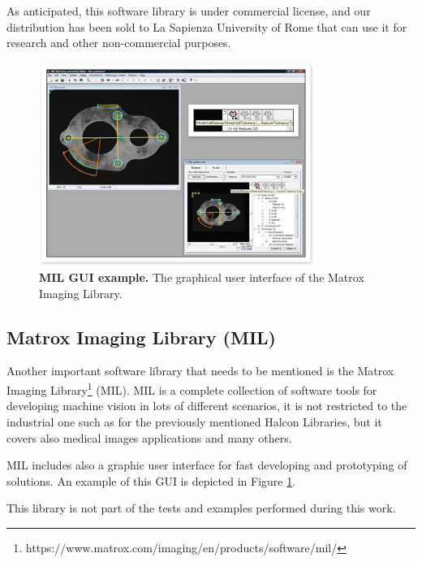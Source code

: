 As anticipated, this software library is under commercial license, and our distribution has been sold to La Sapienza University of Rome that can use it for research and other non-commercial purposes. 

\begin{figure}
    \centering
    \includegraphics[width=0.8\textwidth]{figures/1_perception_and_sensing_in_robotics/mil_gui_example}
    \caption{\textbf{MIL GUI example.} The graphical user interface of the Matrox Imaging Library.} 
    \label{fig:mil_example}
\end{figure}

\subsection{Matrox Imaging Library (MIL)}\label{subsec:mil}
Another important software library that needs to be mentioned is the Matrox Imaging Library\footnote{https://www.matrox.com/imaging/en/products/software/mil/} (MIL). MIL is a complete collection of software tools for developing machine vision in lots of different scenarios, it is not restricted to the industrial one such as for the previously mentioned Halcon Libraries, but it covers also medical images applications and many others.

MIL includes also a graphic user interface for fast developing and prototyping of solutions. An example of this GUI is depicted in Figure \ref{fig:mil_example}.

This library is not part of the tests and examples performed during this work.